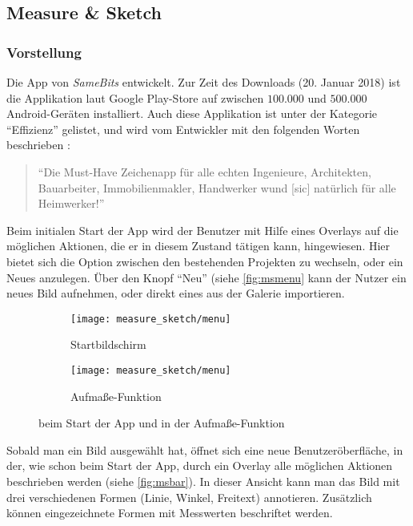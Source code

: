 \subsection{Measure \& Sketch}
\subsubsection{Vorstellung}
Die App \ms{} von \emph{SameBits} entwickelt.
Zur Zeit des Downloads (20. Januar 2018) ist die Applikation laut Google Play-Store auf zwischen $100.000$ und $500.000$ Android-Geräten installiert.
Auch diese Applikation ist unter der Kategorie ``Effizienz'' gelistet, und wird vom Entwickler mit den folgenden Worten beschrieben \citep{BitsMS}:

\begin{quote}
  ``Die Must-Have Zeichenapp für alle echten Ingenieure, Architekten, Bauarbeiter, Immobilienmakler, Handwerker wund [sic] natürlich für alle Heimwerker!''
\end{quote}

\noindent
Beim initialen Start der App wird der Benutzer mit Hilfe eines Overlays auf die möglichen Aktionen, die er in diesem Zustand tätigen kann, hingewiesen.
Hier bietet sich die Option zwischen den bestehenden Projekten zu wechseln, oder ein Neues anzulegen.
Über den Knopf ``Neu'' (siehe \autoref{fig:msmenu} kann der Nutzer ein neues Bild aufnehmen, oder direkt eines aus der Galerie importieren. \\

\begin{figure}[h]
  \centering
	\begin{subfigure}[t]{0.4\textwidth}
		\texttt{[image: measure\_sketch/menu]}
		\caption{Startbildschirm}
		\label{fig:msmenu}	
	\end{subfigure}
	\begin{subfigure}[t]{0.4\textwidth}
		\texttt{[image: measure\_sketch/menu]}
		\caption{Aufmaße-Funktion} 
		\label{fig:msbar}	
	\end{subfigure}
  \caption{\ms{} beim Start der App und in der Aufmaße-Funktion}
\end{figure}

\noindent
{}
Sobald man ein Bild ausgewählt hat, öffnet sich eine neue Benutzeröberfläche, in der, wie schon beim Start der App, durch ein Overlay alle möglichen Aktionen beschrieben werden (siehe \autoref{fig:msbar}).
In dieser Ansicht kann man das Bild mit drei verschiedenen Formen (Linie, Winkel, Freitext) annotieren. 
Zusätzlich können eingezeichnete Formen mit Messwerten beschriftet werden.\\

